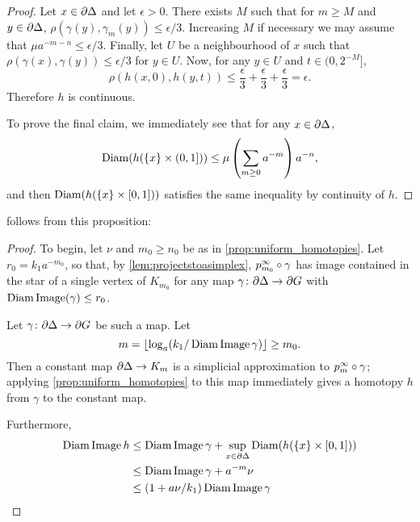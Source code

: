 \documentclass[a4paper]{article}
\begin{document}
\begin{proof}
  Let $x \in \partial\Delta$ and let $\epsilon > 0$. There exists $M$ such
  that for $m \geq M$ and $y \in \partial \Delta$, $\rho(\gamma(y),
  \gamma_m(y)) \leq \epsilon/3$. Increasing $M$ if necessary we may assume that
  $\mu a^{-m-n} \leq \epsilon/3$.
  Finally, let $U$ be a neighbourhood of $x$ such that $\rho(\gamma(x),
  \gamma(y)) \leq \epsilon/3$ for $y \in U$. Now, for any $y \in U$ and $t \in (0, 2^{-M}]$,
  \begin{equation*}
    \rho(h(x,0), h(y,t)) \leq \frac{\epsilon}{3} + \frac{\epsilon}{3} +
        \frac{\epsilon}{3} = \epsilon.
  \end{equation*}
  Therefore $h$ is continuous.

  To prove the final claim, we immediately see that for any $x \in
  \partial\Delta$,
  \begin{equation*}
    \operatorname{Diam}(h(\{x\}\times (0,1])) \leq \mu \left(\sum_{m\geq 0} a^{-m}\right)a^{-n},
  \end{equation*}
  and then $\operatorname{Diam}(h(\{x\}\times [0,1]))$ satisfies the same inequality by
  continuity of $h$.
\end{proof}

 follows from this proposition:

\ddagimpliesLCd*

\begin{proof}
  To begin, let $\nu$ and $m_0 \geq n_0$ be as in
  \cref{prop:uniform_homotopies}. Let $r_0 =
  k_1a^{-m_0}$, so that, by \cref{lem:projectstoasimplex},
  $p^\infty_{m_0}\circ\gamma$ has image contained in the star of a single
  vertex of $K_{m_0}$ for any map $\gamma\colon\partial\Delta\to\partial
  G$ with $\operatorname{Diam}\operatorname{Image}(\gamma)\leq r_0$.

  Let $\gamma\colon\partial\Delta\to\partial G$ be such a map. Let 
  \begin{equation*}
    m = \lfloor\log_a(k_1/\operatorname{Diam}\operatorname{Image}\gamma)\rfloor \geq m_0.
  \end{equation*}
  Then a constant map $\partial\Delta \to K_m$ is a simplicial approximation
  to $p^\infty_m\circ\gamma$; applying \cref{prop:uniform_homotopies} to
  this map immediately gives a homotopy $h$ from $\gamma$ to the constant map.

  Furthermore,
  \begin{align*}
    \operatorname{Diam}\operatorname{Image} h &\leq \operatorname{Diam}\operatorname{Image}\gamma + \sup_{x \in\partial\Delta}
                                    \operatorname{Diam}(h(\{x\} \times [0,1])) \\
                  &\leq \operatorname{Diam}\operatorname{Image}\gamma + a^{-m} \nu \\
                  &\leq (1 + a\nu/k_1) \operatorname{Diam}\operatorname{Image}\gamma \qedhere
  \end{align*}
\end{proof}
\end{document}
